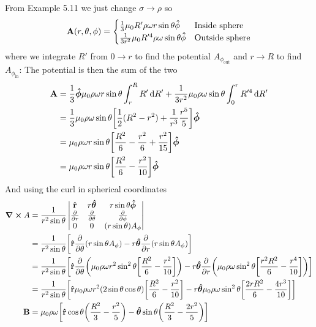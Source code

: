 \documentclass[../main.tex]{subfiles}
\begin{document}
From Example 5.11 we just change $\sigma \to \rho$ so
\begin{align*}
    \vb A (r, \theta, \phi) = \begin{cases}
        \frac{1}{3} \mu_0 R' \rho \omega r \sin\theta \vu \phi & \text{Inside sphere} \\
        \frac{1}{3r^2} \mu_0 R'^4 \rho\omega \sin\theta \vu \phi & \text{Outside sphere}
    \end{cases}
\end{align*}
where we integrate $R'$ from $0 \to r$ to find the potential $A_{\phi_\text{out}}$ and
$r \to R$ to find $A_{\phi_\text{in}}$: The potential is then the sum of the two
\begin{align*}
    \vb A &= \frac{1}{3} \vu*\phi \mu_0 \rho \omega r \sin\theta \int_r^R R' \dd{R'} 
    + \frac{1}{3r^2} \mu_0 \rho \omega \sin\theta \int_0^r R'^4 \dd{R'} \\
    &= \frac{1}{3} \mu_0 \rho \omega \sin\theta \qt[
        \frac{1}{2} (R^2 - r^2) + \frac{1}{r^3} \frac{r^5}{5}
    ] \vu*\phi \\
    &= \mu_0 \rho \omega r \sin\theta \qt[
        \frac{R^2}{6} - \frac{r^2}{6} + \frac{r^2}{15}
    ] \vu*\phi \\
    &= \mu_0 \rho \omega r \sin\theta \qt[
        \frac{R^2}{6} - \frac{r^2}{10}
    ] \vu*\phi
\end{align*}
And using the curl in spherical coordinates
\begin{align*} 
    \curl A &= \frac{1}{r^2 \sin\theta} \begin{vmatrix}
        \vu r & r \vu*\theta & r \sin\theta \vu*\phi \\
        \pdv{r} & \pdv{\theta} & \pdv{\phi} \\
        0 & 0 & (r \sin\theta) A_\phi
    \end{vmatrix} \\
    &= \frac{1}{r^2 \sin\theta} \qt[
        \vu r\pdv{\theta}(r\sin\theta A_\phi)  - r\vu*\theta \pdv{r}(r\sin\theta A_\phi)
    ] \\
    &= \frac{1}{r^2 \sin\theta} \qt[
        \vu r \pdv{\theta} (\mu_0 \rho \omega r^2 \sin^2\theta \qt[
            \frac{R^2}{6} - \frac{r^2}{10}
        ])
        - r\vu*\theta \pdv{r} (\mu_0 \rho \omega \sin^2\theta \qt[
            \frac{r^2 R^2}{6} - \frac{r^4}{10}
        ])
    ] \\
    &= \frac{1}{r^2 \sin\theta} \qt[
        \vu r \mu_0 \rho \omega r^2 (2\sin\theta \cos\theta) \qt[
            \frac{R^2}{6} - \frac{r^2}{10}
        ]
        - r\vu*\theta \mu_0 \rho \omega \sin^2\theta \qt[
            \frac{2rR^2}{6} - \frac{4r^3}{10}
        ]
    ] \\
    \vb B &= \mu_0 \rho \omega \qt[
        \vu r \cos\theta \qt(\frac{R^2}{3} - \frac{r^2}{5}) 
        - \vu*\theta \sin\theta \qt(
            \frac{R^2}{3} - \frac{2r^2}{5}
        )
    ] 
\end{align*}
\end{document}
